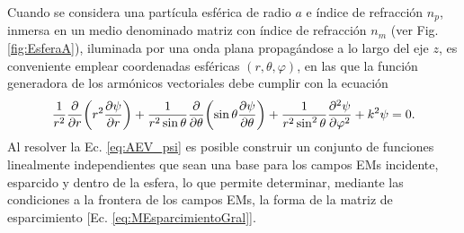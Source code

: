Cuando se considera una partícula esférica de radio $a$ e índice de refracción $n_p$, inmersa en un medio denominado matriz con índice de refracción $n_m$ (ver Fig. \ref{fig:EsferaA}), iluminada por una onda plana propagándose a lo largo del eje $z$, es conveniente emplear coordenadas esféricas $(r, \theta, \varphi)$, en las que la función generadora de los armónicos vectoriales debe cumplir con la ecuación 
	\begin{align}
	\frac{1}{r^2} \pdv{r}\qty(r^2\pdv{\psi}{r})+ 
	\frac{1}{r^2\sin\theta}\pdv{\theta}\qty(\sin\theta\pdv{\psi}{\theta})
	 + \frac{1}{r^2\sin^2\theta}\pdv[2]{\psi}{\varphi} + k^2 \psi =0. \label{eq:AEV_psi}
	\end{align}
Al resolver la Ec. \eqref{eq:AEV_psi} es posible construir un conjunto de funciones linealmente independientes que sean una base para los campos EMs incidente, esparcido y dentro de la esfera, lo que permite determinar, mediante las condiciones a la frontera de los campos EMs, la forma de la matriz de esparcimiento [Ec. \eqref{eq:MEsparcimientoGral}].

